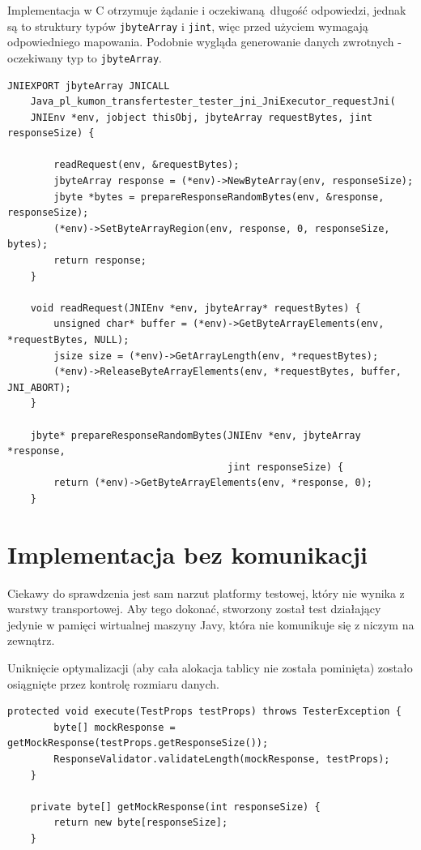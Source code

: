 Implementacja w C otrzymuje żądanie i oczekiwaną długość odpowiedzi, jednak są to struktury typów \texttt{jbyteArray} i \texttt{jint}, więc przed użyciem wymagają odpowiedniego mapowania. Podobnie wygląda generowanie danych zwrotnych - oczekiwany typ to \texttt{jbyteArray}.

\begin{lstlisting}[caption={Natywna implementacja w C.},captionpos=b]
    JNIEXPORT jbyteArray JNICALL 
    Java_pl_kumon_transfertester_tester_jni_JniExecutor_requestJni(
    JNIEnv *env, jobject thisObj, jbyteArray requestBytes, jint responseSize) {

        readRequest(env, &requestBytes);
        jbyteArray response = (*env)->NewByteArray(env, responseSize);
        jbyte *bytes = prepareResponseRandomBytes(env, &response, responseSize);
        (*env)->SetByteArrayRegion(env, response, 0, responseSize, bytes);
        return response;
    }

    void readRequest(JNIEnv *env, jbyteArray* requestBytes) {
        unsigned char* buffer = (*env)->GetByteArrayElements(env, *requestBytes, NULL);
        jsize size = (*env)->GetArrayLength(env, *requestBytes);
        (*env)->ReleaseByteArrayElements(env, *requestBytes, buffer, JNI_ABORT);
    }

    jbyte* prepareResponseRandomBytes(JNIEnv *env, jbyteArray *response,
                                      jint responseSize) {
        return (*env)->GetByteArrayElements(env, *response, 0);
    }
\end{lstlisting}


\section{Implementacja bez komunikacji}

Ciekawy do sprawdzenia jest sam narzut platformy testowej, który nie wynika z warstwy transportowej. Aby tego dokonać, stworzony został test działający jedynie w pamięci wirtualnej maszyny Javy, która nie komunikuje się z niczym na zewnątrz.

Uniknięcie optymalizacji (aby cała alokacja tablicy nie została pominięta) zostało osiągnięte przez kontrolę rozmiaru danych.

\clearpage

\begin{lstlisting}[caption={Test sprawdzający narzut samej platformy.},captionpos=b]
    protected void execute(TestProps testProps) throws TesterException {
        byte[] mockResponse = getMockResponse(testProps.getResponseSize());
        ResponseValidator.validateLength(mockResponse, testProps);
    }

    private byte[] getMockResponse(int responseSize) {
        return new byte[responseSize];
    }
\end{lstlisting}
